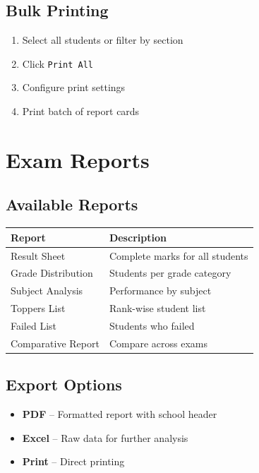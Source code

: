 \documentclass[12pt,a4paper]{report}
\begin{document}
\section{Bulk Printing}

\begin{enumerate}[leftmargin=*]
    \item Select all students or filter by section
    \item Click \texttt{Print All}
    \item Configure print settings
    \item Print batch of report cards
\end{enumerate}

\chapter{Exam Reports}

\section{Available Reports}

\begin{longtable}{@{}p{4cm}p{9cm}@{}}
\toprule
\textbf{Report} & \textbf{Description} \\
\midrule
\endhead
Result Sheet & Complete marks for all students \\
Grade Distribution & Students per grade category \\
Subject Analysis & Performance by subject \\
Toppers List & Rank-wise student list \\
Failed List & Students who failed \\
Comparative Report & Compare across exams \\
\bottomrule
\end{longtable}

\section{Export Options}

\begin{itemize}[leftmargin=*]
    \item \textbf{PDF} -- Formatted report with school header
    \item \textbf{Excel} -- Raw data for further analysis
    \item \textbf{Print} -- Direct printing
\end{itemize}
\end{document}
